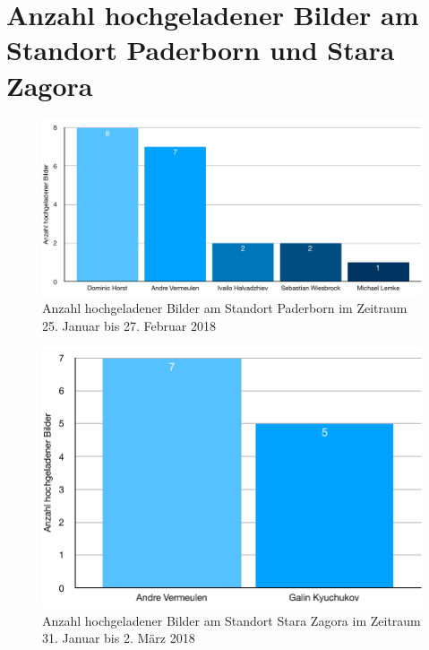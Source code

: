 \chapter{Anzahl hochgeladener Bilder am Standort Paderborn und Stara Zagora}
\begin{figure}[h]
  \centering
  \includegraphics[keepaspectratio, width=\textwidth]{data/usage_pb}
  \caption{Anzahl hochgeladener Bilder am Standort Paderborn im Zeitraum 25. Januar bis 27. Februar 2018}
  \label{fig:usagepb}
\end{figure}

\begin{figure}[h]
  \centering
  \includegraphics[keepaspectratio, width=\textwidth]{data/usage_bg}
  \caption{Anzahl hochgeladener Bilder am Standort Stara Zagora im Zeitraum 31. Januar bis 2. März 2018}
  \label{fig:usagebg}
\end{figure}
